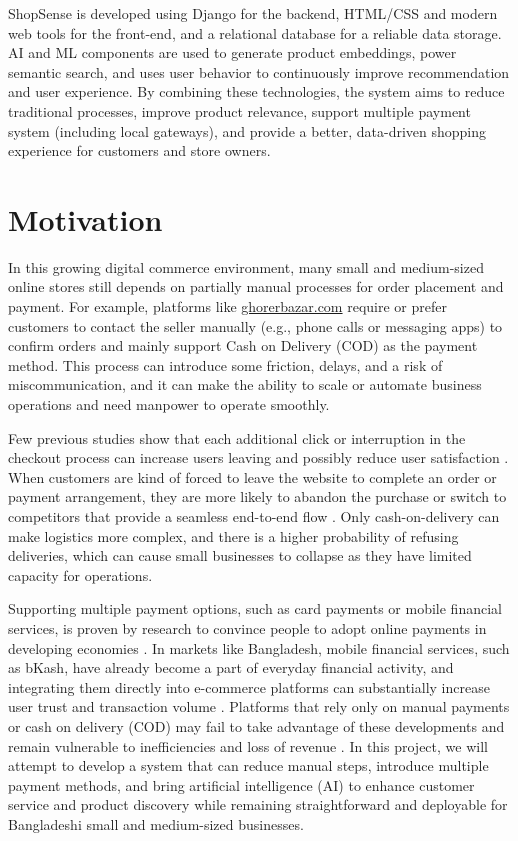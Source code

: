 ShopSense is developed using Django for the backend, HTML/CSS and modern web tools for the front-end, and a relational database for a reliable data storage. AI and ML components are used to generate product embeddings, power semantic search, and uses  user behavior to continuously improve recommendation and user experience. By combining these technologies, the system aims to reduce traditional processes, improve product relevance, support multiple payment system (including local gateways), and provide a better, data-driven shopping experience for customers and store owners.

\section{Motivation}
In this growing digital commerce environment, many small and medium-sized online stores still depends on partially manual processes for order placement and payment. For example, platforms like \href{https://ghorerbazar.com}{ghorerbazar.com} require or prefer customers to contact the seller manually (e.g., phone calls or messaging apps) to confirm orders and mainly support Cash on Delivery (COD) as the payment method. This process can introduce some friction, delays, and a risk of miscommunication, and it can make the ability to scale or automate business operations and need manpower to operate smoothly.

Few previous studies show that each additional click or interruption in the checkout process can increase users leaving and possibly reduce user satisfaction \cite{lee2020checkout}. When customers are  kind of forced to leave the website to complete an order or payment arrangement, they are more likely to abandon the purchase or switch to competitors that provide a seamless end-to-end flow \cite{lee2020checkout,hasan2021mobile}. Only cash-on-delivery can make logistics more complex, and there is a higher probability of refusing deliveries, which can cause small businesses to collapse as they have limited capacity for operations\cite{rahman2018cod}.


Supporting multiple payment options, such as card payments or mobile financial services, is proven by research to convince people to adopt online payments in developing economies  \cite{hasan2021mobile}. In markets like Bangladesh, mobile financial services, such as bKash, have already become a part of everyday financial activity, and integrating them directly into e-commerce platforms can substantially increase user trust and transaction volume  \cite{hasan2021mobile}. Platforms that rely only on manual payments or cash on delivery (COD) may fail to take advantage of these developments and remain vulnerable to inefficiencies and loss of revenue \cite{rahman2018cod}. 
In this project, we will attempt to develop a system that can reduce manual steps, introduce multiple payment methods, and bring artificial intelligence (AI) to enhance customer service and product discovery while remaining straightforward and deployable for Bangladeshi small and medium-sized businesses. 

